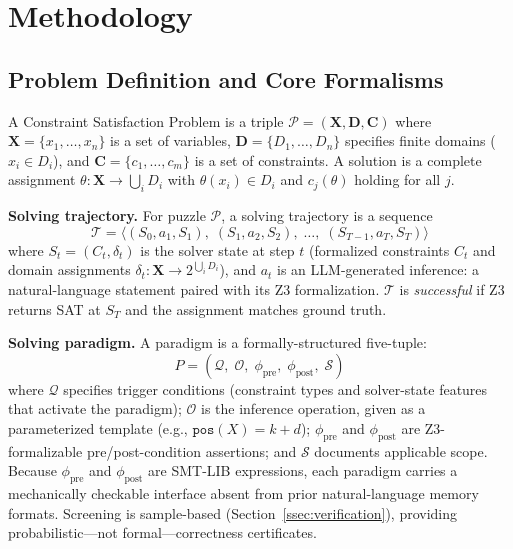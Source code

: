 
\section{Methodology}
\label{sec:method}

\subsection{Problem Definition and Core Formalisms}

A Constraint Satisfaction Problem is a triple $\mathcal{P} = (\mathbf{X}, \mathbf{D}, \mathbf{C})$ where $\mathbf{X} = \{x_1, \ldots, x_n\}$ is a set of variables, $\mathbf{D} = \{D_1, \ldots, D_n\}$ specifies finite domains ($x_i \in D_i$), and $\mathbf{C} = \{c_1, \ldots, c_m\}$ is a set of constraints. A solution is a complete assignment $\theta: \mathbf{X} \to \bigcup_i D_i$ with $\theta(x_i) \in D_i$ and $c_j(\theta)$ holding for all $j$.

\textbf{Solving trajectory.} For puzzle $\mathcal{P}$, a solving trajectory is a sequence
\[
\mathcal{T} = \langle (S_0, a_1, S_1),\; (S_1, a_2, S_2),\; \ldots,\; (S_{T-1}, a_T, S_T) \rangle
\]
where $S_t = (C_t, \delta_t)$ is the solver state at step $t$ (formalized constraints $C_t$ and domain assignments $\delta_t: \mathbf{X} \to 2^{\bigcup_i D_i}$), and $a_t$ is an LLM-generated inference: a natural-language statement paired with its Z3 formalization. $\mathcal{T}$ is \textit{successful} if Z3 returns SAT at $S_T$ and the assignment matches ground truth.

\textbf{Solving paradigm.} A paradigm is a formally-structured five-tuple:
\[
P = (\mathcal{Q},\; \mathcal{O},\; \phi_{\text{pre}},\; \phi_{\text{post}},\; \mathcal{S})
\]
where $\mathcal{Q}$ specifies trigger conditions (constraint types and solver-state features that activate the paradigm); $\mathcal{O}$ is the inference operation, given as a parameterized template (e.g., $\texttt{pos}(X) = k + d$); $\phi_{\text{pre}}$ and $\phi_{\text{post}}$ are Z3-formalizable pre/post-condition assertions; and $\mathcal{S}$ documents applicable scope. Because $\phi_{\text{pre}}$ and $\phi_{\text{post}}$ are SMT-LIB expressions, each paradigm carries a mechanically checkable interface absent from prior natural-language memory formats. Screening is sample-based (Section~\ref{ssec:verification}), providing probabilistic—not formal—correctness certificates.

